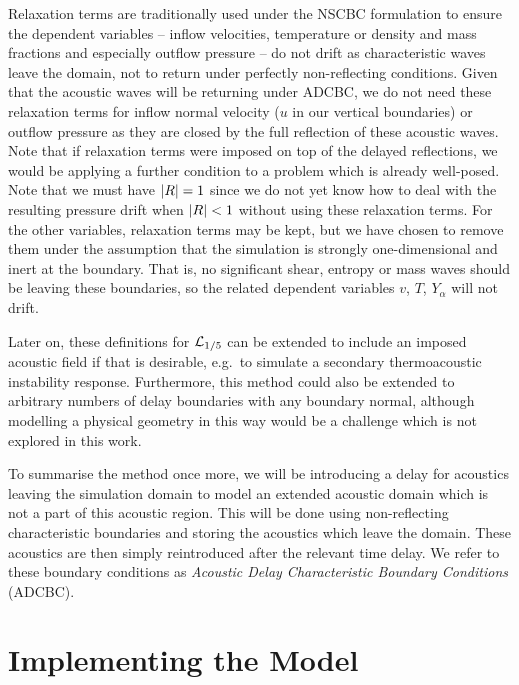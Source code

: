 Relaxation terms are traditionally used under the NSCBC formulation to ensure the dependent variables -- inflow velocities, temperature or density and mass fractions and especially outflow pressure -- do not drift as characteristic waves leave the domain, not to return under perfectly non-reflecting conditions. Given that the acoustic waves will be returning under ADCBC, we do not need these relaxation terms for inflow normal velocity ($u$ in our vertical boundaries) or outflow pressure as they are closed by the full reflection of these acoustic waves. Note that if relaxation terms were imposed on top of the delayed reflections, we would be applying a further condition to a problem which is already well-posed. Note that we must have $\abs{R} = 1$ since we do not yet know how to deal with the resulting pressure drift when $\abs{R} < 1$ without using these relaxation terms. For the other variables, relaxation terms may be kept, but we have chosen to remove them under the assumption that the simulation is strongly one-dimensional and inert at the boundary. That is, no significant shear, entropy or mass waves should be leaving these boundaries, so the related dependent variables $v$, $T$, $Y_α$ will not drift.

Later on, these definitions for $\mathcal{L}_{1/5}$ can be extended to include an imposed acoustic field if that is desirable, e.g.\ to simulate a secondary thermoacoustic instability response. Furthermore, this method could also be extended to arbitrary numbers of delay boundaries with any boundary normal, although modelling a physical geometry in this way would be a challenge which is not explored in this work.

To summarise the method once more, we will be introducing a delay for acoustics leaving the simulation domain to model an extended acoustic domain which is not a part of this acoustic region. This will be done using non-reflecting characteristic boundaries and storing the acoustics which leave the domain. These acoustics are then simply reintroduced after the relevant time delay. We refer to these boundary conditions as \emph{Acoustic Delay Characteristic Boundary Conditions} (ADCBC).




\section{Implementing the Model}

